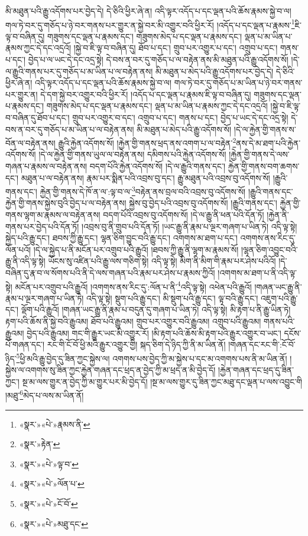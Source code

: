 མི་མཐུན་པའི་རྒྱུ་འདོགས་པར་བྱེད་དེ། དེ་ཅིའི་ཕྱིར་ཞེ་ན། འདི་ལྟར་འདོད་པ་དང་ལྡན་པའི་ཆོས་རྣམས་སྐྱེ་བ་ལ། གལ་ཏེ་བར་དུ་གཅོད་པ་ཉེ་བར་གནས་པར་གྱུར་ན་སྐྱེ་བར་མི་འགྱུར་བའི་ཕྱིར་རོ། །འདོད་པ་དང་ལྡན་པ་རྣམས་\footnote{«སྣར་»«པེ་»རྣམས་ནི་}ཇི་ལྟ་བ་བཞིན་དུ། གཟུགས་དང་ལྡན་པ་རྣམས་དང་། གཟུགས་མེད་པ་དང་ལྡན་པ་རྣམས་དང་། ལྡན་པ་མ་ཡིན་པ་རྣམས་ཀྱང་དེ་དང་འདྲའོ། །སྐྱེ་བ་ཇི་ལྟ་བ་བཞིན་དུ། ཐོབ་པ་དང་། གྲུབ་པར་འགྱུར་པ་དང་། འགྲུབ་པ་དང་། གནས་པ་དང་། བྱེད་པ་ལ་ཡང་དེ་དང་འདྲ་སྟེ། དེ་བས་ན་བར་དུ་གཅོད་པ་ལ་བརྟེན་ནས་མི་མཐུན་པའི་རྒྱུ་འདོགས་སོ། །དེ་ལ་རྒྱུའི་གནས་པར་དུ་གཅོད་པ་མ་ཡིན་པ་ལ་བརྟེན་ནས། མི་མཐུན་པ་མེད་པའི་རྒྱུ་འདོགས་པར་བྱེད་དེ། དེ་ཅིའི་ཕྱིར་ཞེ་ན། འདི་ལྟར་འདོད་པ་དང་ལྡན་པའི་ཆོས་རྣམས་སྐྱེ་བ་ལ། གལ་ཏེ་བར་དུ་གཅོད་པ་མ་ཡིན་པ་ཉེ་བར་གནས་པར་གྱུར་ན། དེ་དག་སྐྱེ་བར་འགྱུར་བའི་ཕྱིར་རོ། །འདོད་པ་དང་ལྡན་པ་རྣམས་ཇི་ལྟ་བ་བཞིན་དུ། གཟུགས་དང་ལྡན་པ་རྣམས་དང་། གཟུགས་མེད་པ་དང་ལྡན་པ་རྣམས་དང་། ལྡན་པ་མ་ཡིན་པ་རྣམས་ཀྱང་དེ་དང་འདྲའོ། །སྐྱེ་བ་ཇི་ལྟ་བ་བཞིན་དུ་ཐོབ་པ་དང་། གྲུབ་པར་འགྱུར་བ་དང་། འགྲུབ་པ་དང་། གནས་པ་དང་། བྱེད་པ་ཡང་དེ་དང་འདྲ་སྟེ། དེ་བས་ན་བར་དུ་གཅོད་པ་མ་ཡིན་པ་ལ་བརྟེན་ནས། མི་མཐུན་པ་མེད་པའི་རྒྱུ་འདོགས་སོ། །དེ་ལ་རྐྱེན་གྱི་གནས་ས་བོན་ལ་བརྟེན་ནས། རྒྱུའི་རྐྱེན་འདོགས་སོ། །རྐྱེན་གྱི་གནས་ཕྲད་ནས་འགག་པ་ལ་བརྟེན་\footnote{«སྣར་»རྟེན་}ནས་དེ་མ་ཐག་པའི་རྐྱེན་འདོགས་སོ། །དེ་ལ་རྐྱེན་གྱི་གནས་ཡུལ་ལ་བརྟེན་ནས། དམིགས་པའི་རྐྱེན་འདོགས་སོ། །རྐྱེན་གྱི་གནས་དེ་ལས་གཞན་པ་རྣམས་ལ་བརྟེན་ནས། བདག་པོའི་རྐྱེན་འདོགས་སོ། །དེ་ལ་རྒྱུའི་གནས་དང་། རྐྱེན་གྱི་གནས་བག་ཆགས་དང་། མཐུན་པ་ལ་བརྟེན་ནས། རྣམ་པར་སྨིན་པའི་འབྲས་བུ་དང་། རྒྱུ་མཐུན་པའི་འབྲས་བུ་འདོགས་སོ། །རྒྱུའི་གནས་དང་། རྐྱེན་གྱི་གནས་དེ་ཁོ་ན་ལ་:ལྟ་བ་ལ་\footnote{«སྣར་»«པེ་»ལྟ་བ་}བརྟེན་ནས་བྲལ་བའི་འབྲས་བུ་འདོགས་སོ། །རྒྱུའི་གནས་དང་རྐྱེན་གྱི་གནས་སྐྱེས་བུའི་བྱེད་པ་ལ་བརྟེན་ནས། སྐྱེས་བུ་བྱེད་པའི་འབྲས་བུ་འདོགས་སོ། །རྒྱུའི་གནས་དང་། རྐྱེན་གྱི་གནས་ལྷག་མ་རྣམས་ལ་བརྟེན་ནས། བདག་པོའི་འབྲས་བུ་འདོགས་སོ། །དེ་ལ་རྒྱུ་ནི་ཕན་པའི་དོན་ཏོ། །རྐྱེན་ནི་གནས་པར་བྱེད་པའི་དོན་ཏོ། །འབྲས་བུ་ནི་གྲུབ་པའི་དོན་ཏོ། །ཡང་རྒྱུ་ནི་རྣམ་པ་ལྔར་གཞག་པ་ཡིན་ཏེ། འདི་ལྟ་སྟེ། སྐྱེད་པའི་རྒྱུ་དང་། ཐབས་ཀྱི་རྒྱུ་དང་། ལྷན་ཅིག་བྱུང་བའི་རྒྱུ་དང་། འགགས་མ་ཐག་པ་དང་། འགགས་ནས་རིང་དུ་ལོན་པའོ། །དེ་ལ་སྐྱེད་པ་ནི་མངོན་པར་འགྲུབ་པའི་རྒྱུའོ། །ཐབས་ཀྱི་རྒྱུ་ནི་ལྷག་མ་རྣམས་སོ། །ལྷན་ཅིག་འབྱུང་བའི་རྒྱུ་ནི་འདི་ལྟ་སྟེ། ཡོངས་སུ་འཛིན་པའི་རྒྱུ་ལས་གཅིག་སྟེ། འདི་ལྟ་སྟེ། མིག་ནི་མིག་གི་རྣམ་པར་ཤེས་པའིའོ། །དེ་བཞིན་དུ་རྣ་བ་ལ་སོགས་པའི་ནི་དེ་ལས་གཞན་པའི་རྣམ་པར་ཤེས་པ་རྣམས་ཀྱིའོ། །འགགས་མ་ཐག་པ་ནི་འདི་ལྟ་སྟེ། མངོན་པར་འགྲུབ་པའི་རྒྱུའོ། །འགགས་ནས་རིང་དུ་:ལོན་པ་ནི་\footnote{«སྣར་»«པེ་»ལོན་པ་}འདི་ལྟ་སྟེ། འཕེན་པའི་རྒྱུའོ། །གཞན་ཡང་རྒྱུ་ནི་རྣམ་པ་ལྔར་གཞག་པ་ཡིན་ཏེ། འདི་ལྟ་སྟེ། སྡུག་པའི་རྒྱུ་དང་། མི་སྡུག་པའི་རྒྱུ་དང་། ལྟ་བའི་རྒྱུ་དང་། འཇུག་པའི་རྒྱུ་དང་། ལྡོག་པའི་རྒྱུའོ། །གཞན་ཡང་རྒྱུ་ནི་རྣམ་པ་བདུན་དུ་གཞག་པ་ཡིན་ཏེ། འདི་ལྟ་སྟེ། མི་རྟག་པ་ནི་རྒྱུ་ཡིན་ཏེ། རྟག་པའི་ཆོས་ནི་སྐྱེ་བའི་རྒྱུའམ། ཐོབ་པའི་རྒྱུའམ། གྲུབ་པར་འགྱུར་བའི་རྒྱུའམ། འགྲུབ་པའི་རྒྱུའམ། གནས་པའི་རྒྱུའམ། བྱེད་པའི་རྒྱུའམ། གང་གི་རྒྱུར་ཡང་མི་འགྱུར་རོ། །མི་རྟག་པའི་ཆོས་མི་རྟག་པའི་རྒྱུར་འགྱུར་བ་ཡང་། དངོས་པོ་གཞན་དང་། རང་གི་ངོ་བོ་ཕྱི་མའི་རྒྱུར་འགྱུར་གྱི། སྐད་ཅིག་དེ་ཉིད་ཀྱི་ནི་མ་ཡིན་ནོ། །གཞན་དང་རང་གི་:ངོ་བོ་ཉིད་\footnote{«སྣར་»«པེ་»ངོ་བོ་}ཕྱི་མའི་རྒྱུ་བྱེད་དུ་ཟིན་ཀྱང་སྐྱེས་ལ། འགགས་པས་བྱེད་ཀྱི་མ་སྐྱེས་པ་དང་མ་འགགས་པས་ནི་མ་ཡིན་ནོ། །སྐྱེས་ལ་འགགས་སུ་ཟིན་ཀྱང་རྐྱེན་གཞན་དང་ཕྲད་ན་བྱེད་ཀྱི་མ་ཕྲད་ན་མི་བྱེད་དོ། །རྐྱེན་གཞན་དང་ཕྲད་དུ་ཟིན་ཀྱང་། སྔ་མ་ལས་གྱུར་ན་བྱེད་ཀྱི་མ་གྱུར་པར་མི་བྱེད་དོ། །སྔ་མ་ལས་གྱུར་དུ་ཟིན་ཀྱང་མཐུ་དང་ལྡན་པ་ལས་འབྱུང་གི །མཐུ་\footnote{«སྣར་»«པེ་»མཐུ་དང་}མེད་པ་ལས་མ་ཡིན་ནོ། 